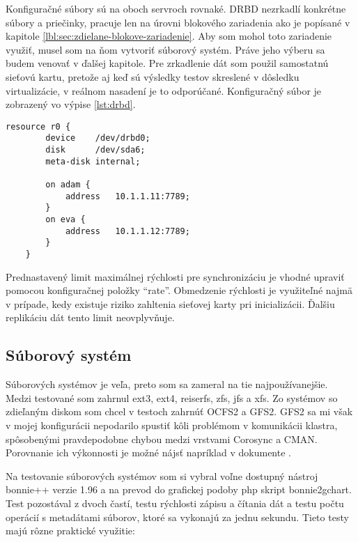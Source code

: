 Konfiguračné súbory sú na oboch servroch rovnaké. DRBD nezrkadlí konkrétne súbory a priečinky, pracuje len na úrovni blokového zariadenia ako je popísané v kapitole \ref{lbl:sec:zdielane-blokove-zariadenie}. Aby som mohol toto zariadenie využiť, musel som na ňom vytvoriť súborový systém. Práve jeho výberu sa budem venovať v ďalšej kapitole. Pre zrkadlenie dát som použil samostatnú sieťovú kartu, pretože aj keď sú výsledky testov skreslené v dôsledku virtualizácie, v reálnom nasadení je to odporúčané. Konfiguračný súbor je zobrazený vo výpise \ref{lst:drbd}.

\begin{lstlisting}[label=lst:drbd,caption=Konfiguračný súbor DRBD zariadenia]
	resource r0 {
		device    /dev/drbd0;
		disk      /dev/sda6;
		meta-disk internal;
		
		on adam {
			address   10.1.1.11:7789;
		}
		on eva {
			address   10.1.1.12:7789;
		}
	}
\end{lstlisting}

Prednastavený limit maximálnej rýchlosti pre synchronizáciu je vhodné upraviť pomocou konfiguračnej položky "`rate"'. Obmedzenie rýchlosti je využiteľné najmä v prípade, kedy existuje riziko zahltenia sieťovej karty pri inicializácii. Ďalšiu replikáciu dát tento limit neovplyvňuje.

\subsection{Súborový systém}

Súborových systémov je veľa, preto som sa zameral na tie najpoužívanejšie. Medzi testované som zahrnul ext3, ext4, reiserfs, zfs, jfs a xfs. Zo systémov so zdieľaným diskom som chcel v testoch zahrnúť OCFS2 a GFS2. GFS2 sa mi však v mojej konfigurácii nepodarilo spustiť kôli problémom v komunikácii klastra, spôsobenými pravdepodobne chybou medzi vrstvami Corosync a CMAN. Porovnanie ich výkonnosti je možné nájsť napríklad v dokumente \cite{pdf:filesystem-comparison}.

Na testovanie súborových systémov som si vybral voľne dostupný nástroj bonnie++ verzie 1.96 a na prevod do grafickej podoby php skript bonnie2gchart. Test pozostával z dvoch častí, testu rýchlosti zápisu a čítania dát a testu počtu operácií s metadátami súborov, ktoré sa vykonajú za jednu sekundu. Tieto testy majú rôzne praktické využitie:

